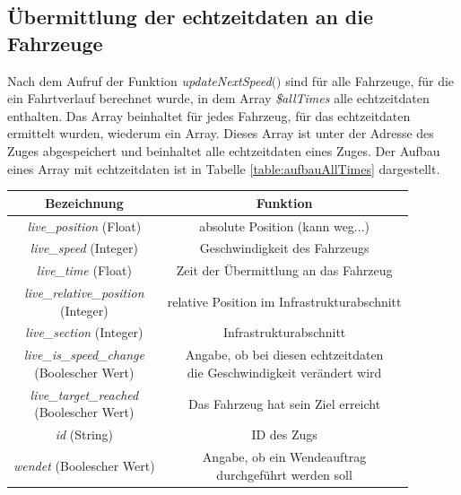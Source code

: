 \subsection{Übermittlung der \Gls{echtzeitdaten} an die Fahrzeuge} \label{main_4}
Nach dem Aufruf der Funktion \textit{updateNextSpeed$($$)$} sind für alle Fahrzeuge, für die ein Fahrtverlauf berechnet wurde, in dem Array \textit{\$allTimes} alle \Gls{echtzeitdaten} enthalten. Das Array beinhaltet für jedes Fahrzeug, für das \Gls{echtzeitdaten} ermittelt wurden, wiederum ein Array. Dieses Array ist unter der Adresse des Zuges abgespeichert und beinhaltet alle \Gls{echtzeitdaten} eines Zuges. Der Aufbau eines Array mit \Gls{echtzeitdaten} ist in Tabelle \ref{table:aufbauAllTimes} dargestellt.
\begin{table}
\begin{center}
\renewcommand{\arraystretch}{1.2}
\begin{tabular}{c|c}
Bezeichnung & Funktion \\ \hline
\textit{live\_position} (Float)                  		&    absolute Position (kann weg...)                \\ \hline
\textit{live\_speed} (Integer)                  		&    Geschwindigkeit des Fahrzeugs                \\ \hline
\textit{live\_time} (Float)                  		&    Zeit der Übermittlung an das Fahrzeug                 \\ \hline
\makecell{\textit{live\_relative\_position}\\(Integer)}                  		&    relative Position im Infrastrukturabschnitt                \\ \hline
\textit{live\_section} (Integer)                  		&    Infrastrukturabschnitt                \\ \hline
\makecell{\textit{live\_is\_speed\_change}\\(Boolescher Wert)}                  		&    \makecell{Angabe, ob bei diesen \Gls{echtzeitdaten}\\die Geschwindigkeit verändert wird}                \\ \hline
\makecell{\textit{live\_target\_reached}\\(Boolescher Wert)}                  		&    Das Fahrzeug hat sein Ziel erreicht                \\ \hline
\textit{id} (String)                  		&    ID des Zugs                \\ \hline
\textit{wendet} (Boolescher Wert)                  		&    \makecell{Angabe, ob ein Wendeauftrag\\durchgeführt werden soll}                \\ \hline

\end{tabular}
\end{center}
\end{table}
